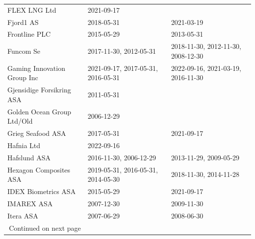 \begin{appendices}
\begin{table}[H]
\begin{tabular}{lll}
FLEX LNG Ltd & 2021-09-17 & \\
Fjord1 AS & 2018-05-31 & 2021-03-19 \\
Frontline PLC & 2015-05-29 & 2013-05-31 \\
Funcom Se & 2017-11-30, 2012-05-31 & 2018-11-30, 2012-11-30, 2008-12-30 \\
Gaming Innovation Group Inc & 2021-09-17, 2017-05-31, 2016-05-31 & 2022-09-16, 2021-03-19, 2016-11-30 \\
Gjensidige Forsikring ASA & 2011-05-31 & \\
Golden Ocean Group Ltd/Old & 2006-12-29 & \\
Grieg Seafood ASA & 2017-05-31 & 2021-09-17 \\
Hafnia Ltd & 2022-09-16 & \\
Hafslund ASA & 2016-11-30, 2006-12-29 & 2013-11-29, 2009-05-29 \\
Hexagon Composites ASA & 2019-05-31, 2016-05-31, 2014-05-30 & 2018-11-30, 2014-11-28 \\
IDEX Biometrics ASA & 2015-05-29 & 2021-09-17 \\
IMAREX ASA & 2007-12-30 & 2009-11-30 \\
Itera ASA & 2007-06-29 & 2008-06-30 \\ 
    \midrule \multicolumn{l}{r}{{Continued on next page}} \\
   \hline
\end{tabular}   
\end{table}

\newpage
\begin{table}[H]
\centering
\scriptsize
\begin{tabularx}\textwidth{lll}
    \midrule {} \\


\end{tabularx}
\end{table}
\end{appendices}
